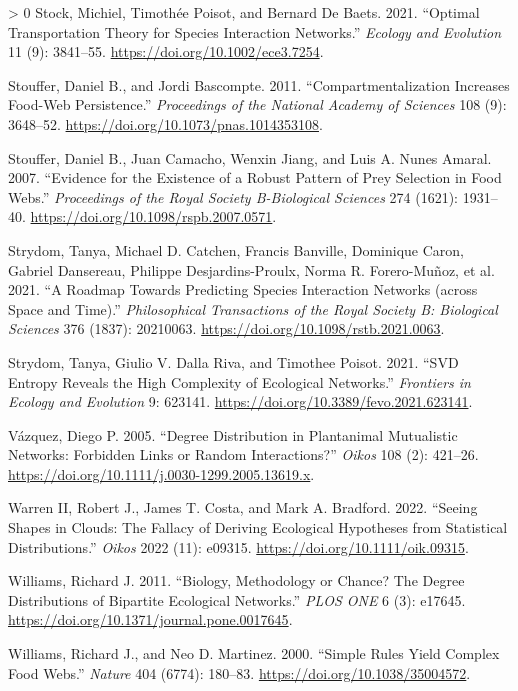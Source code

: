 \documentclass[11pt]{article}
\newlength{\cslhangindent}
\newenvironment{CSLReferences}[3] %
 {%
  \setlength{\parindent}{0pt}
  \ifodd #1 \everypar{\setlength{\hangindent}{\cslhangindent}}\ignorespaces\fi
  \ifnum #2 > 0
  \setlength{\parskip}{#2\baselineskip}
  \fi
 }%
 {}
\begin{document}
\begin{CSLReferences}{1}{0}
\leavevmode\hypertarget{ref-Stock2021OptTra}{}%
Stock, Michiel, Timothée Poisot, and Bernard De Baets. 2021. {``Optimal
Transportation Theory for Species Interaction Networks.''} \emph{Ecology
and Evolution} 11 (9): 3841--55.
\url{https://doi.org/10.1002/ece3.7254}.

\leavevmode\hypertarget{ref-Stouffer2011ComInc}{}%
Stouffer, Daniel B., and Jordi Bascompte. 2011. {``Compartmentalization
Increases Food-Web Persistence.''} \emph{Proceedings of the National
Academy of Sciences} 108 (9): 3648--52.
\url{https://doi.org/10.1073/pnas.1014353108}.

\leavevmode\hypertarget{ref-Stouffer2007EviExi}{}%
Stouffer, Daniel B., Juan Camacho, Wenxin Jiang, and Luis A. Nunes
Amaral. 2007. {``Evidence for the Existence of a Robust Pattern of Prey
Selection in Food Webs.''} \emph{Proceedings of the Royal Society
B-Biological Sciences} 274 (1621): 1931--40.
\url{https://doi.org/10.1098/rspb.2007.0571}.

\leavevmode\hypertarget{ref-Strydom2021RoaPre}{}%
Strydom, Tanya, Michael D. Catchen, Francis Banville, Dominique Caron,
Gabriel Dansereau, Philippe Desjardins-Proulx, Norma R. Forero-Muñoz, et
al. 2021. {``A Roadmap Towards Predicting Species Interaction Networks
(across Space and Time).''} \emph{Philosophical Transactions of the
Royal Society B: Biological Sciences} 376 (1837): 20210063.
\url{https://doi.org/10.1098/rstb.2021.0063}.

\leavevmode\hypertarget{ref-Strydom2021SvdEnt}{}%
Strydom, Tanya, Giulio V. Dalla Riva, and Timothee Poisot. 2021. {``SVD
Entropy Reveals the High Complexity of Ecological Networks.''}
\emph{Frontiers in Ecology and Evolution} 9: 623141.
\url{https://doi.org/10.3389/fevo.2021.623141}.

\leavevmode\hypertarget{ref-Vazquez2005DegDisa}{}%
Vázquez, Diego P. 2005. {``Degree Distribution in Plantanimal
Mutualistic Networks: Forbidden Links or Random Interactions?''}
\emph{Oikos} 108 (2): 421--26.
\url{https://doi.org/10.1111/j.0030-1299.2005.13619.x}.

\leavevmode\hypertarget{ref-WarrenII2022SeeSha}{}%
Warren II, Robert J., James T. Costa, and Mark A. Bradford. 2022.
{``Seeing Shapes in Clouds: The Fallacy of Deriving Ecological
Hypotheses from Statistical Distributions.''} \emph{Oikos} 2022 (11):
e09315. \url{https://doi.org/10.1111/oik.09315}.

\leavevmode\hypertarget{ref-Williams2011BioMet}{}%
Williams, Richard J. 2011. {``Biology, Methodology or Chance? The Degree
Distributions of Bipartite Ecological Networks.''} \emph{PLOS ONE} 6
(3): e17645. \url{https://doi.org/10.1371/journal.pone.0017645}.

\leavevmode\hypertarget{ref-Williams2000SimRul}{}%
Williams, Richard J., and Neo D. Martinez. 2000. {``Simple Rules Yield
Complex Food Webs.''} \emph{Nature} 404 (6774): 180--83.
\url{https://doi.org/10.1038/35004572}.

\end{CSLReferences}
\end{document}
